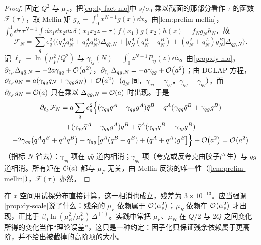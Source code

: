 \begin{proof}
固定 $Q^2$ 与 $\mu_F$，把\cref{eq:dy-fact-nlo}中 $s/\sigma_0$ 乘以截面的那部分看作 $\tau$ 的函数 $\mathcal F(\tau)$，取 Mellin 矩 $g_N\equiv\int_0^1x^{N-1}g(x)\dd x$。由\cref{lem:prelim-mellin}，$\int_0^1\dd\tau\,\tau^{N-1}\int\dd x_1\dd x_2\dd z\,\delta(x_1x_2z-\tau)f(x_1)g(x_2)h(z)=f_Ng_Nh_N$，故
\[
\mathcal F_N=\sum_qe_q^2\Big\{\big(q_N^A\bar q_N^B+\bar q_N^Aq_N^B\big)\Delta_{q\bar q,N}+\big[g_N^A(q_N^B+\bar q_N^B)+(q_N^A+\bar q_N^A)g_N^B\big]\Delta_{qg,N}\Big\}.
\]
记 $\ell_F\equiv\ln(\mu_F^2/Q^2)$ 与 $\gamma_{ij}(N)=\int_0^1z^{N-1}P_{ij}(z)\dd z$。由\cref{prop:dy-nlo}，$\partial_{\ell_F}\Delta_{q\bar q,N}=-2a\gamma_{qq}+\mathcal{O}\!\left(a^2\right)$，$\partial_{\ell_F}\Delta_{qg,N}=-a\gamma_{qg}+\mathcal{O}\!\left(a^2\right)$；由 DGLAP 方程，$\partial_{\ell_F}q_N=a(\gamma_{qq}q_N+\gamma_{qg}g_N)+\mathcal{O}\!\left(a^2\right)$（$\bar q_N$ 同，$\gamma_{\bar q\bar q}=\gamma_{qq}$，$\gamma_{\bar qg}=\gamma_{qg}$），而 $\partial_{\ell_F}g_N=\mathcal{O}\!\left(a\right)$ 只在乘以 $\Delta_{qg,N}=\mathcal{O}\!\left(a\right)$ 时出现。于是
\begin{multline*}
\partial_{\ell_F}\mathcal F_N=a\sum_qe_q^2\Big\{(\gamma_{qq}q^A+\gamma_{qg}g^A)\bar q^B+q^A(\gamma_{qq}\bar q^B+\gamma_{qg}g^B)\\
+(\gamma_{qq}\bar q^A+\gamma_{qg}g^A)q^B+\bar q^A(\gamma_{qq}q^B+\gamma_{qg}g^B)\\
-2\gamma_{qq}\big(q^A\bar q^B+\bar q^Aq^B\big)-\gamma_{qg}\big[g^A(q^B+\bar q^B)+(q^A+\bar q^A)g^B\big]\Big\}+\mathcal{O}\!\left(a^2\right)=\mathcal{O}\!\left(a^2\right)
\end{multline*}
（指标 $N$ 省去）：$\gamma_{qq}$ 项在 $q\bar q$ 道内相消；$\gamma_{qg}$ 项（夸克或反夸克由胶子产生）与 $qg$ 道相消。所有矩在 $\mathcal{O}\!\left(a\right)$ 都与 $\mu_F$ 无关，由 Mellin 反演的唯一性（\cref{lem:prelim-mellin}），$\mathcal F(\tau)$ 亦然。
\end{proof}

在 $x$ 空间用试探分布直接计算，这一相消也成立，残差为 $3\times10^{-13}$。应当强调\cref{prop:dy-scale}说了什么：残余的 $\mu_F$ 依赖属于 $\mathcal{O}\!\left(\alpha_s^2\right)$；$\mu_R$ 依赖在 $\mathcal{O}\!\left(\alpha_s^2\right)$ 才出现，正比于 $\beta_0\ln(\mu_R^2/\mu_F^2)\,\Delta^{(1)}$。实践中常把 $\mu_F$、$\mu_R$ 在 $Q/2$ 与 $2Q$ 之间变化所得的变化当作“理论误差”，这只是一种约定：因子化只保证残余依赖属于更高阶，并不给出被截掉的高阶项的大小。

